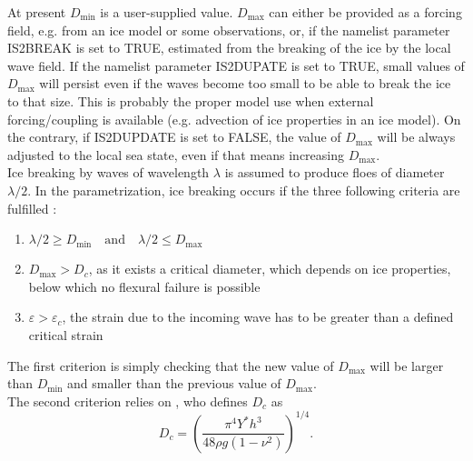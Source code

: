 \noindent
At present $D_{\min}$ is a user-supplied value. $D_{\max}$ can either be 
provided as a forcing field, e.g. from an 
ice model or some observations, or, if the namelist parameter {\code IS2BREAK} is set to {\code TRUE}, 
estimated from 
the breaking of the ice by the local wave field. If the namelist parameter {\code IS2DUPATE}  is set to  
{\code TRUE}, small values of $D_{\max}$ will persist even if the waves become too small to be able to break the ice to 
that size. This is probably the proper model 
use when  external forcing/coupling is available (e.g. advection of ice properties in an ice model). 
 On the contrary, if {\code IS2DUPDATE} is set to  {\code FALSE}, the value of $D_{\max}$ will be always adjusted to the local sea state, 
even if that means increasing $D_{\max}$.\\


Ice breaking by waves of wavelength $\lambda$ is assumed to produce floes of diameter $\lambda / 2$. 
In the parametrization, ice breaking occurs if the three following criteria are fulfilled \citep{art:Wea13}:
\begin{enumerate}
\item $\lambda/2 \geq D_{\min} \quad \mathrm{and} \quad  \lambda/2 \leq D_{\max}$
\item $D_{\max}>D_c$, as it exists a critical diameter, which depends on ice properties, below which no flexural failure is possible
\item $\varepsilon>\varepsilon_c$, the strain due to the incoming wave has to 
be greater than a defined critical strain
\end{enumerate}
The first criterion is simply checking that the new value of $D_{\max}$ will be larger than $D_{\min}$ and smaller 
than the previous value of $D_{\max}$.\\

The second criterion relies on \cite{inc:M86}, who defines $D_{c}$ as
\begin{equation}
D_{c}=\left(\frac{\pi^4 Y^* h^3}{48 \rho g (1 -\nu ^2)}\right)^{1/4}. 
\end{equation}


